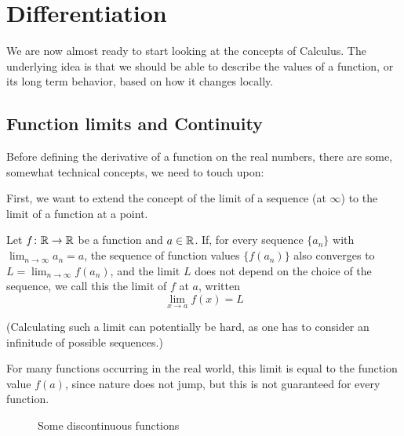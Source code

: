 \chapter{Differentiation}
\label{chdiff}

We are now almost ready to start looking at the concepts of Calculus. The
underlying idea is that we should be able to describe the values of a
function, or its long term behavior, based on how it changes locally.

\section{Function limits and Continuity}

Before defining the derivative of a function on the real numbers,
there are some, somewhat
technical concepts, we need to touch upon:

First, we want to extend the concept of the limit of a sequence (at
$\infty$) to the limit of a function at a point.
\begin{defn}
Let $f\colon{\mathbb R}\to{\mathbb R}$ be a function and $a\in{\mathbb R}$. If, for every sequence
$\{a_n\}$ with $\lim_{n\to\infty} a_n=a$, the sequence of function values
$\{f(a_n)\}$ also converges to $L=\lim_{n\to\infty} f(a_n)$, and the limit
$L$ does not depend on the choice of the sequence, we call this the limit
of $f$ at $a$, written
\[
\lim_{x\to a} f(x)=L
\]
\end{defn}

(Calculating such a limit can potentially be hard, as one has to consider an
infinitude of possible sequences.)

For many functions occurring in the real world, this limit is equal to the
function value $f(a)$, since nature does not jump, but this is not
guaranteed for every function.

\begin{figure}[t]
\begin{center}
\end{center}
\caption{Some discontinuous functions}
\label{figdiscont}
\end{figure}

